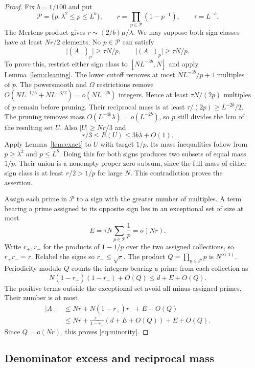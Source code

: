 \documentclass[11pt,leqno]{amsart}
\numberwithin{equation}{section}
\theoremstyle{definition}
\theoremstyle{remark}
\newcommand{\card}[1]{\lvert #1\rvert}
\begin{document}
\begin{proof}
Fix $b=1/100$ and put
\[
 \mathcal P=\{p:\lambda^2\le p\le L^b\},\qquad
 r=\prod_{p\in\mathcal P}(1-p^{-1}),\qquad \tau=L^{-b}.
\]
The Mertens product gives $r\sim(2/b)\mu/\lambda$.
We may suppose both sign classes have at least $Nr/2$ elements.
No $p\in\mathcal P$ can satisfy
\begin{equation}\label{eq:bothpopular}
 \card{(A_+)_p}\ge\tau N/p,
 \qquad \card{(A_-)_p}\ge\tau N/p.
\end{equation}
To prove this, restrict either sign class to $[NL^{-3b},N]$ and apply
Lemma~\ref{lem:cleaning}. The lower cutoff removes at most
$NL^{-3b}/p+1$ multiples of $p$.
The powersmooth and $\Omega$ restrictions remove
$O(NL^{-1/5}+NL^{-3/2})=o(NL^{-2b})$ integers.
Hence at least $\tau N/(2p)$ multiples of $p$ remain before pruning.
Their reciprocal mass is at least $\tau/(2p)\ge L^{-2b}/2$.
The pruning removes mass $O(L^{-4b}\lambda)=o(L^{-2b})$, so $p$ still
divides the lcm of the resulting set $U$.
Also $\card U\ge Nr/3$ and
\[
 r/3\le R(U)\le3b\lambda+O(1).
\]
Apply Lemma~\ref{lem:exact} to $U$ with target $1/p$.
Its mass inequalities follow from $p\ge\lambda^2$ and $p\le L^b$.
Doing this for both signs produces two subsets of equal mass $1/p$.
Their union is a nonempty proper zero subsum, since the full mass of
either sign class is at least $r/2>1/p$ for large $N$.
This contradiction proves the assertion.

Assign each prime in $\mathcal P$ to a sign with the greater number of
multiples. A term bearing a prime assigned to its opposite sign lies
in an exceptional set of size at most
\[
 E=\tau N\sum_{p\in\mathcal P}\frac1p=o(Nr).
\]
Write $r_+,r_-$ for the products of $1-1/p$ over the two assigned
collections, so $r_+r_-=r$. Relabel the signs so $r_-\le\sqrt r$.
The product $Q=\prod_{p\in\mathcal P}p$ is $N^{o(1)}$.
Periodicity modulo $Q$ counts the integers bearing a prime from each
collection as
\[
 N(1-r_+)(1-r_-)+O(Q)\le d+E+O(Q).
\]
The positive terms outside the exceptional set avoid all minus-assigned
primes. Their number is at most
\begin{align*}
 \card{A_+}
 &\le Nr+N(1-r_+)r_-+E+O(Q)\\
 &\le Nr+\frac{r_-}{1-r_-}(d+E+O(Q))+E+O(Q).
\end{align*}
Since $Q=o(Nr)$, this proves \eqref{eq:minority}.
\end{proof}

\subsection{Denominator excess and reciprocal mass}
\end{document}

